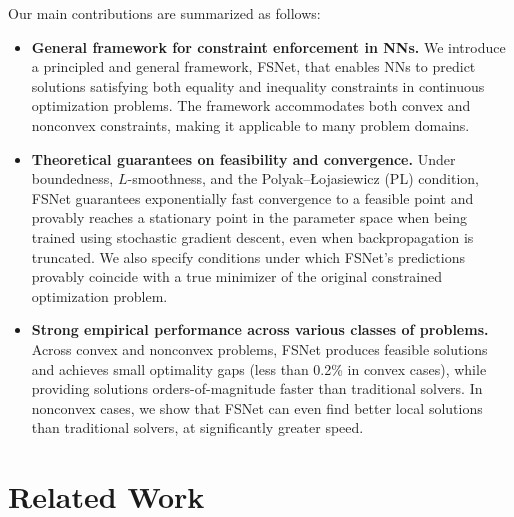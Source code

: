 \documentclass{article}
\begin{document}
Our main contributions are summarized as follows: 
\begin{itemize}
    \item \textbf{General framework for constraint enforcement in NNs.} We introduce a principled and general framework, FSNet, that enables NNs to predict solutions satisfying both equality and inequality constraints in continuous optimization problems. The framework accommodates both convex and nonconvex constraints, making it applicable to many problem domains. %

    \item \textbf{Theoretical guarantees on feasibility and convergence.} Under boundedness, $L$-smoothness, and the Polyak–Łojasiewicz (PL) condition, FSNet guarantees exponentially fast convergence to a feasible point and provably reaches a stationary point in the parameter space when being trained using stochastic gradient descent, even when backpropagation is truncated.
    We also specify conditions under which FSNet's predictions provably coincide with a true minimizer of the original constrained optimization problem.
        
    \item \textbf{Strong empirical performance across various classes of problems.} 
    Across convex and nonconvex problems, FSNet produces feasible solutions and achieves
    small optimality gaps (less than 0.2\% in convex cases), while providing solutions orders-of-magnitude faster than traditional solvers.
    In nonconvex cases, we show that FSNet can even find better local solutions than traditional solvers, at significantly greater speed. 
\end{itemize}

\section{Related Work}
\end{document}
